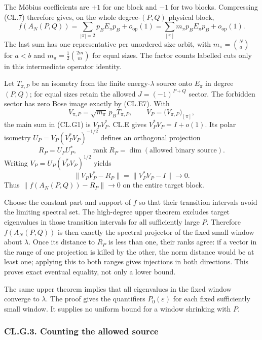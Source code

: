 \documentclass[a4paper,11pt]{article}
\numberwithin{equation}{section}
\begin{document}
The Möbius coefficients are \(+1\) for one block and \(-1\) for two blocks. Compressing (CL.7) therefore gives, on the whole degree-\((P,Q)\) physical block, \[
f(A_N(P,Q))
=\sum_{|\pi|=2}p_BE_\pi p_B+o_{\mathrm{op}}(1)
=\sum_{[\pi]}m_\pi p_BE_\pi p_B+o_{\mathrm{op}}(1).
\tag{CL.G1}
\] The last sum has one representative per unordered size orbit, with \(m_\pi=\binom Na\) for \(a<b\) and \(m_\pi=\frac12\binom{2m}{m}\) for equal sizes. The factor counts labelled cuts only in this intermediate operator identity.

Let \(T_{\pi,P}\) be an isometry from the finite energy-\(\lambda\) source onto \(E_\pi\) in degree \((P,Q)\); for equal sizes retain the allowed \(J=(-1)^{P+Q}\) sector. The forbidden sector has zero Bose image exactly by (CL.E7). With \[
V_{\pi,P}=\sqrt{m_\pi}\,p_BT_{\pi,P},\qquad
V_P=\bigl(V_{\pi,P}\bigr)_{[\pi]},
\] the main sum in (CL.G1) is \(V_PV_P^*\). CL.E gives \(V_P^*V_P=I+o(1)\). Its polar isometry \(U_P=V_P(V_P^*V_P)^{-1/2}\) defines an orthogonal projection \[
R_P=U_PU_P^*,\qquad
\operatorname{rank}R_P=\dim(\text{allowed binary source}).
\tag{CL.G2}
\] Writing \(V_P=U_P(V_P^*V_P)^{1/2}\) yields \[
\|V_PV_P^*-R_P\|=\|V_P^*V_P-I\|\longrightarrow0.
\tag{CL.G3}
\] Thus \(\|f(A_N(P,Q))-R_P\|\to0\) on the entire target block.

Choose the constant part and support of \(f\) so that their transition intervals avoid the limiting spectral set. The high-degree upper theorem excludes target eigenvalues in those transition intervals for all sufficiently large \(P\). Therefore \(f(A_N(P,Q))\) is then exactly the spectral projector of the fixed small window about \(\lambda\). Once its distance to \(R_P\) is less than one, their ranks agree: if a vector in the range of one projection is killed by the other, the norm distance would be at least one; applying this to both ranges gives injections in both directions. This proves exact eventual equality, not only a lower bound.

The same upper theorem implies that all eigenvalues in the fixed window converge to \(\lambda\). The proof gives the quantifiers \(P_0(\varepsilon)\) for each fixed sufficiently small window. It supplies no uniform bound for a window shrinking with \(P\).

\hypertarget{cl.g.3.-counting-the-allowed-source}{%
\subsubsection{CL.G.3. Counting the allowed source}\label{cl.g.3.-counting-the-allowed-source}}
\end{document}
